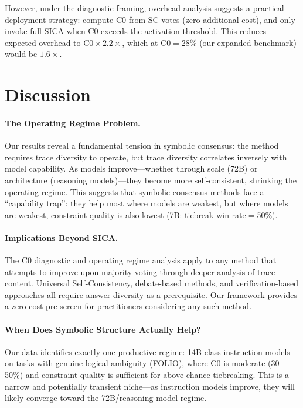 \documentclass[11pt]{article}
\begin{document}
However, under the diagnostic framing, overhead analysis suggests a practical deployment strategy: compute C0 from SC votes (zero additional cost), and only invoke full SICA when C0 exceeds the activation threshold. This reduces expected overhead to $\text{C0} \times 2.2\times$, which at C0$=$28\% (our expanded benchmark) would be $1.6\times$.

\section{Discussion}

\paragraph{The Operating Regime Problem.} Our results reveal a fundamental tension in symbolic consensus: the method requires trace diversity to operate, but trace diversity correlates inversely with model capability. As models improve---whether through scale (72B) or architecture (reasoning models)---they become more self-consistent, shrinking the operating regime. This suggests that symbolic consensus methods face a ``capability trap'': they help most where models are weakest, but where models are weakest, constraint quality is also lowest (7B: tiebreak win rate$=$50\%).

\paragraph{Implications Beyond SICA.} The C0 diagnostic and operating regime analysis apply to any method that attempts to improve upon majority voting through deeper analysis of trace content. Universal Self-Consistency, debate-based methods, and verification-based approaches all require answer diversity as a prerequisite. Our framework provides a zero-cost pre-screen for practitioners considering any such method.

\paragraph{When Does Symbolic Structure Actually Help?} Our data identifies exactly one productive regime: 14B-class instruction models on tasks with genuine logical ambiguity (FOLIO), where C0 is moderate (30--50\%) and constraint quality is sufficient for above-chance tiebreaking. This is a narrow and potentially transient niche---as instruction models improve, they will likely converge toward the 72B/reasoning-model regime.
\end{document}
